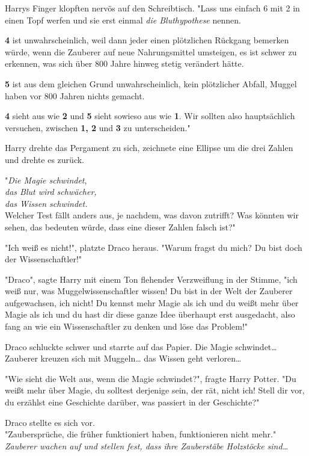 {Harrys Finger klopften nervös auf den Schreibtisch. "Lass uns einfach 6 mit 2 in einen Topf werfen und sie erst einmal \emph{die Bluthypothese} nennen.

\textbf{4} ist unwahrscheinlich, weil dann jeder einen plötzlichen Rückgang bemerken würde, wenn die Zauberer auf neue Nahrungsmittel umsteigen, es ist schwer zu erkennen, was sich über 800 Jahre hinweg stetig verändert hätte.

\textbf{5} ist aus dem gleichen Grund unwahrscheinlich, kein plötzlicher Abfall, Muggel haben vor 800 Jahren nichts gemacht.

\textbf{4} sieht aus wie \textbf{2} und \textbf{5} sieht sowieso aus wie \textbf{1}. Wir sollten also hauptsächlich versuchen, zwischen \textbf{1, 2} und \textbf{3} zu unterscheiden."

Harry drehte das Pergament zu sich, zeichnete eine Ellipse um die drei Zahlen und drehte es zurück.

"\emph{Die Magie schwindet},\\ \emph{das Blut wird schwächer,}\\ \emph{das Wissen schwindet.}\\ Welcher Test fällt anders aus, je nachdem, was davon zutrifft? Was könnten wir sehen, das bedeuten würde, dass eine dieser Zahlen falsch ist?"

"Ich weiß es nicht!", platzte Draco heraus. "Warum fragst du mich? Du bist doch der Wissenschaftler!"

"Draco", sagte Harry mit einem Ton flehender Verzweiflung in der Stimme, "ich weiß nur, was Muggelwissenschaftler wissen! Du bist in der Welt der Zauberer aufgewachsen, ich nicht! Du kennst mehr Magie als ich und du weißt mehr über Magie als ich und du hast dir diese ganze Idee überhaupt erst ausgedacht, also fang an wie ein Wissenschaftler zu denken und löse das Problem!"

Draco schluckte schwer und starrte auf das Papier. Die Magie schwindet… Zauberer kreuzen sich mit Muggeln… das Wissen geht verloren…

"Wie sieht die Welt aus, wenn die Magie schwindet?", fragte Harry Potter. "Du weißt mehr über Magie, du solltest derjenige sein, der rät, nicht ich! Stell dir vor, du erzählst eine Geschichte darüber, was passiert in der Geschichte?"

Draco stellte es sich vor.\\ "Zaubersprüche, die früher funktioniert haben, funktionieren nicht mehr."\\ \emph{Zauberer wachen auf und stellen fest, dass ihre Zauberstäbe Holzstöcke sind…}

}
